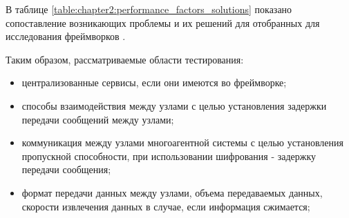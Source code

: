 В таблице \ref{table:chapter2:performance_factors_solutions} показано сопоставление возникающих проблемы и их решений для отобранных для исследования фреймворков \cite{blasco2012multiagent,bruyninckx2001orocos,einhorn2012mira,metta2006yarp,mohamed2008survey,elkady2012comprehensive}.



Таким образом, рассматриваемые области тестирования:
\begin{itemize}[noitemsep]
	\item централизованные сервисы, если они имеются во фреймворке;
	\item способы взаимодействия между узлами с целью установления задержки передачи сообщений между узлами;
	\item коммуникация между узлами многоагентной системы с целью установления пропускной способности, при использовании шифрования - задержку передачи сообщения;
	\item формат передачи данных между узлами, объема передаваемых данных, скорости извлечения данных в случае, если информация сжимается;
\end{itemize}

